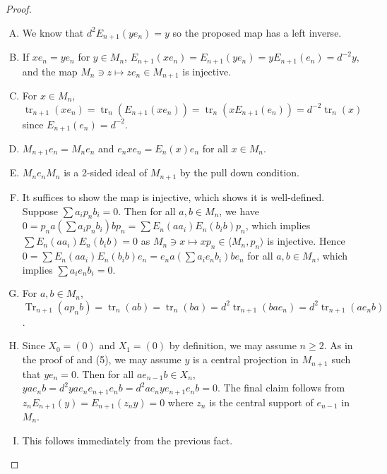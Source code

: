 \documentclass[11pt]{article}
\theoremstyle{plain}
\theoremstyle{definition}
\DeclareMathOperator{\Tr}{Tr}
\DeclareMathOperator{\tr}{tr}
\begin{document}
\begin{proof} 

\begin{enumerate}[(A)]
\item

We know that $d^2E_{n+1}(ye_n) = y $ so the proposed map has a left inverse.

\item

If $xe_n = ye_n$ for $y\in M_n$,  $E_{n+1}(xe_n) = E_{n+1}(y e_n) = y E_{n+1}(e_n) = d^{-2} y$, and the map $M_n\ni z\mapsto ze_n\in M_{n+1}$ is injective.

\item

For $x\in M_n$, $\tr_{n+1}(xe_n) = \tr_n(E_{n+1}(xe_n)) = \tr_n(x E_{n+1}(e_n)) = d^{-2} \tr_n(x)$ since $E_{n+1}(e_n) = d^{-2}$.

\item

$M_{n+1} e_n = M_n e_n$ and $e_nxe_n = E_n(x)e_n$ for all $x\in M_n$.

\item

$M_ne_nM_n$ is a 2-sided ideal of $M_{n+1}$ by the pull down condition.

\item

It suffices to show the map is injective, which shows it is well-defined.
Suppose $\sum a_i p_n b_i = 0$.
Then for all $a,b\in M_n$, we have $0=p_na\left(\sum a_i p_n b_i\right) bp_n = \sum E_{n}(aa_i)E_n(b_ib)p_n$, which implies $\sum E_{n}(aa_i)E_n(b_ib) = 0$ as $M_n \ni x\mapsto xp_n \in \langle M_n, p_n\rangle$ is injective.
Hence $0 = \sum E_{n}(aa_i)E_n(b_ib)e_n = e_na\left(\sum a_i e_n b_i\right) be_n$ for all $a,b\in M_n$, which implies $\sum a_i e_n b_i = 0$.

\item

For $a,b\in M_n$, 
$\Tr_{n+1}(ap_n b) = \tr_n(ab) = \tr_n(ba) = d^2\tr_{n+1}(bae_n) = d^2 \tr_{n+1}(ae_n b)$.

\item

Since $X_0 = (0)$ and $X_1 = (0)$ by definition, we may assume $n\geq 2$.
As in the proof of \cite[Thm.~4.6.3.vi]{MR999799} and (5), we may assume $y$ is a central projection in $M_{n+1}$ such that $y e_{n} = 0$.
Then for all $ae_{n-1} b \in X_n$, $y ae_n b = d^2 yae_n e_{n+1}e_n b = d^2 ae_n ye_{n+1} e_n b = 0$.
The final claim follows from $z_{n}E_{n+1}(y) = E_{n+1}(z_n y)= 0$ where $z_n$ is the central support of $e_{n-1}$ in $M_n$.

\item

This follows immediately from the previous fact.

\end{enumerate}

\end{proof}
\end{document}
